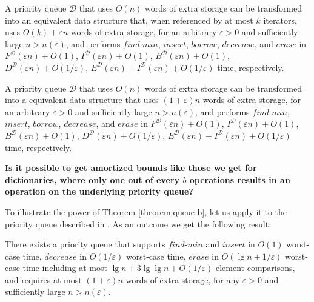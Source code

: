 \documentclass{DIKU-article}
\newcommand{\Findmin}{\mbox{$\mathit{find}$}\textnormal{-}\allowbreak{}\mbox{$\mathit{min}$}}
\newcommand{\Insert}{\mbox{$\mathit{insert}$}}
\newcommand{\Erase}{\mbox{$\mathit{erase}$}}
\newcommand{\Decrease}{\mbox{$\mathit{decrease}$}}
\newcommand{\Borrow}{\mbox{$\mathit{borrow}$}}
\begin{document}
\begin{theorem}
\label{theorem:queue-a}
A priority queue $\mathcal{D}$ that uses $O(n)$ words of extra storage
can be transformed into an
equivalent data structure that, when referenced by at most $k$
iterators,
uses
$O(k)+\varepsilon n$ words of extra storage, for an arbitrary
$\varepsilon > 0$ and sufficiently large $n > n(\varepsilon)$, and performs 
\Findmin{}, \Insert{},
\Borrow{}, \Decrease{}, and \Erase{} in
$F^{\mathcal{D}}(\varepsilon n) + O(1)$,
$I^{\mathcal{D}}(\varepsilon n) + O(1)$,
$B^{\mathcal{D}}(\varepsilon n) + O(1)$,
$D^{\mathcal{D}}(\varepsilon n) + O(1/\varepsilon)$,
$E^{\mathcal{D}}(\varepsilon n) + I^{\mathcal{D}}(\varepsilon n) + O(1/\varepsilon)$ time, respectively.
\end{theorem}



\begin{theorem}
\label{theorem:queue-b}
A priority queue $\mathcal{D}$ that uses $O(n)$ words of extra storage
can be transformed into a equivalent data structure that
uses
$(1+\varepsilon)n$ words of extra storage, for an arbitrary
$\varepsilon > 0$ and sufficiently large $n > n(\varepsilon)$, and performs 
\Findmin{}, \Insert{},
\Borrow{}, \Decrease{}, and \Erase{} in
$F^{\mathcal{D}}(\varepsilon n) + O(1)$,
$I^{\mathcal{D}}(\varepsilon n) + O(1)$,
$B^{\mathcal{D}}(\varepsilon n) + O(1)$,
$D^{\mathcal{D}}(\varepsilon n) + O(1/\varepsilon)$,
$E^{\mathcal{D}}(\varepsilon n) + I^{\mathcal{D}}(\varepsilon n) + O(1/\varepsilon)$ time, respectively.
\end{theorem}

\noindent\textbf{Is it possible to get amortized bounds like those we
get for dictionaries, where only one out of every $b$ operations
results in an operation on the underlying priority queue?}

To illustrate the power of Theorem \ref{theorem:queue-b}, let us apply
it to the priority queue described in \cite{EJK06}. As an outcome we
get the following result:

\begin{corollary}
\label{corollary:queue}
There exists a priority queue that supports \Findmin{} and \Insert{}
in $O(1)$ worst-case time, \Decrease{} in $O(1/\varepsilon)$
worst-case time, \Erase{} in $O(\lg n + 1/\varepsilon)$ worst-case
time including at most $\lg n + 3\lg\lg n + O(1/\varepsilon)$ element
comparisons, and requires at most $(1 + \varepsilon)n$ words of extra
storage, for any $\varepsilon > 0$ and sufficiently large $n > n(\varepsilon)$.
\end{corollary}
\end{document}
